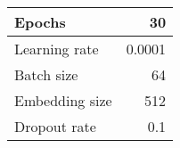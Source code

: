 \documentclass[convert]{standalone}
\begin{document}
    
\begin{tabular}{|l|r|}
\hline
Epochs & 30\\
\hline
Learning rate & 0.0001\\
\hline
Batch size & 64\\
\hline
Embedding size & 512\\
\hline
Dropout rate & 0.1\\
\hline
\end{tabular}
\end{document}
